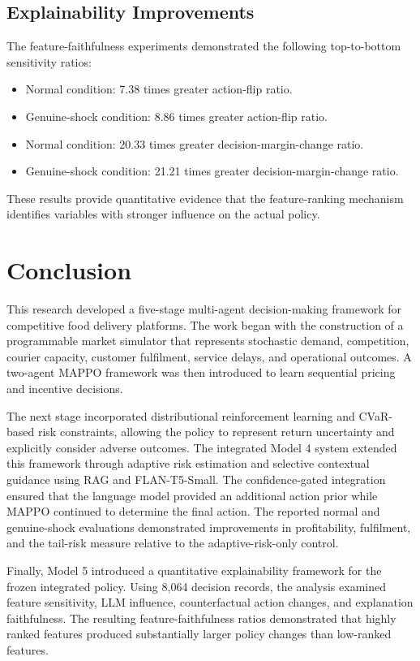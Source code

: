 \documentclass[conference]{IEEEtran}
\begin{document}
\subsection{Explainability Improvements}
The feature-faithfulness experiments demonstrated the following top-to-bottom sensitivity ratios:
\begin{itemize}
  \item Normal condition: 7.38 times greater action-flip ratio.
  \item Genuine-shock condition: 8.86 times greater action-flip ratio.
  \item Normal condition: 20.33 times greater decision-margin-change ratio.
  \item Genuine-shock condition: 21.21 times greater decision-margin-change ratio.
\end{itemize}
These results provide quantitative evidence that the feature-ranking mechanism identifies variables with stronger influence on the actual policy.

\section{Conclusion}
This research developed a five-stage multi-agent decision-making framework for competitive food delivery platforms. The work began with the construction of a programmable market simulator that represents stochastic demand, competition, courier capacity, customer fulfilment, service delays, and operational outcomes. A two-agent MAPPO framework was then introduced to learn sequential pricing and incentive decisions.

The next stage incorporated distributional reinforcement learning and CVaR-based risk constraints, allowing the policy to represent return uncertainty and explicitly consider adverse outcomes. The integrated Model 4 system extended this framework through adaptive risk estimation and selective contextual guidance using RAG and FLAN-T5-Small. The confidence-gated integration ensured that the language model provided an additional action prior while MAPPO continued to determine the final action. The reported normal and genuine-shock evaluations demonstrated improvements in profitability, fulfilment, and the tail-risk measure relative to the adaptive-risk-only control.

Finally, Model 5 introduced a quantitative explainability framework for the frozen integrated policy. Using 8,064 decision records, the analysis examined feature sensitivity, LLM influence, counterfactual action changes, and explanation faithfulness. The resulting feature-faithfulness ratios demonstrated that highly ranked features produced substantially larger policy changes than low-ranked features.
\end{document}
